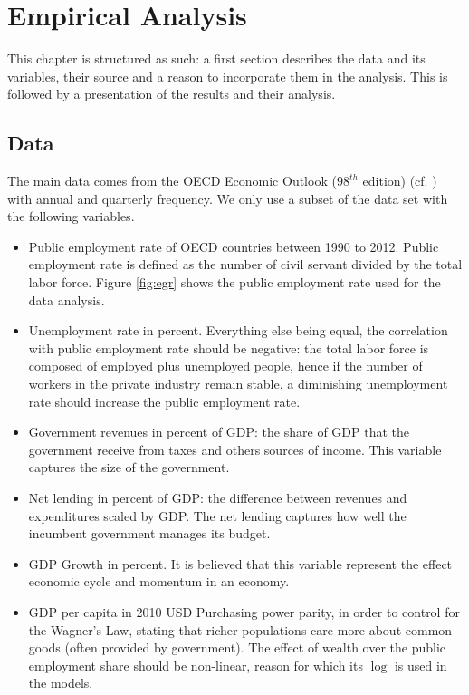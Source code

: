 \chapter{Empirical Analysis}

This chapter is structured as such: a first section describes the data and its
variables, their source and a reason to incorporate them in the analysis. This
is followed by a presentation of the results and their analysis.

\section{Data}

The main data comes from the OECD Economic Outlook ($98^{th}$ edition)
(cf. \cite{oecd2015eo}) with annual and quarterly frequency. We only use a
subset of the data set with the following variables.
\begin{itemize}
\item Public employment rate of OECD countries between 1990 to 2012. Public
  employment rate is defined as the number of civil servant divided by the
  total labor force. Figure \ref{fig:egr} shows the public employment rate used
  for the data analysis.
\item Unemployment rate in percent. Everything else being equal, the
  correlation with public employment rate should be negative: the total labor
  force is composed of employed plus unemployed people, hence if the number of
  workers in the private industry remain stable, a diminishing unemployment
  rate should increase the public employment rate.
\item Government revenues in percent of GDP: the share of GDP that the
  government receive from taxes and others sources of income. This variable
  captures the size of the government.
\item Net lending in percent of GDP: the difference between revenues and
  expenditures scaled by GDP. The net lending captures how well the incumbent
  government manages its budget.
\item GDP Growth in percent. It is believed that this variable represent the
  effect economic cycle and momentum in an economy.
\item GDP per capita in 2010 USD Purchasing power parity, in order to control
  for the Wagner's Law, stating that richer populations care more about common
  goods (often provided by government). The effect of wealth over the public
  employment share should be non-linear, reason for which its $\log$ is used in
  the models.
\end{itemize}

